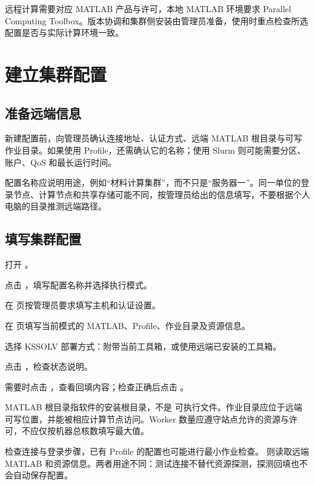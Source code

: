 远程计算需要对应 MATLAB\regmark{} 产品与许可，本地 MATLAB\regmark{} 环境要求 Parallel Computing Toolbox。版本协调和集群侧安装由管理员准备，使用时重点检查所选配置是否与实际计算环境一致。

\section{建立集群配置}

\subsection{准备远端信息}

新建配置前，向管理员确认连接地址、认证方式、远端 MATLAB\regmark{} 根目录与可写作业目录。如果使用 Profile，还需确认它的名称；使用 Slurm 则可能需要分区、账户、QoS 和最长运行时间。

配置名称应说明用途，例如“材料计算集群”，而不只是“服务器一”。同一单位的登录节点、计算节点和共享存储可能不同，按管理员给出的信息填写，不要根据个人电脑的目录推测远端路径。

\subsection{填写集群配置}

\begin{steps}
\item 打开 。
\item 点击 ，填写配置名称并选择执行模式。
\item 在  页按管理员要求填写主机和认证设置。
\item 在  页填写当前模式的 MATLAB\regmark{}、Profile、作业目录及资源信息。
\item 选择 KSSOLV 部署方式：附带当前工具箱，或使用远端已安装的工具箱。
\item 点击 ，检查状态说明。
\item 需要时点击 ，查看回填内容；检查正确后点击 。
\end{steps}

MATLAB\regmark{} 根目录指软件的安装根目录，不是  可执行文件。作业目录应位于远端可写位置，并能被相应计算节点访问。Worker 数量应遵守站点允许的资源与许可，不应仅按机器总核数填写最大值。

 检查连接与登录步骤，已有 Profile 的配置也可能进行最小作业检查。 则读取远端 MATLAB\regmark{} 和资源信息。两者用途不同：测试连接不替代资源探测，探测回填也不会自动保存配置。

